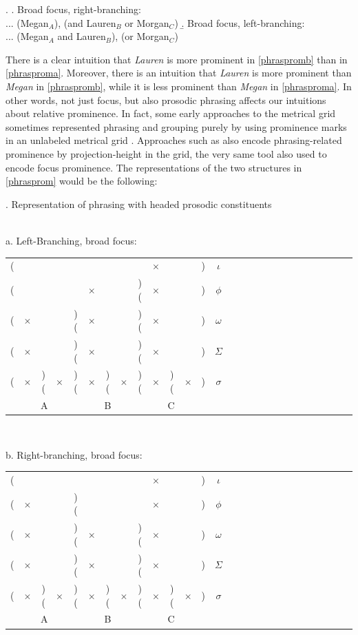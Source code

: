 \documentclass[preprint,review,12pt,authoryear,times]{elsarticle}
\newcommand{\g}{$\times$}
\begin{document}
\ex.\label{phrasprom}
\a. Broad focus, right-branching:\\
... (Megan$_A$), (and Lauren$_B$ or Morgan$_C$) \label{phrasproma}
\b. Broad focus, left-branching:\\
... (Megan$_A$ and Lauren$_B$), (or Morgan$_C$) \label{phraspromb}

There is a clear intuition that {\em Lauren} is more prominent in \ref{phraspromb} than in \ref{phrasproma}.  Moreover, there is an intuition that {\em Lauren} is more prominent than {\em Megan} in  \ref{phraspromb}, while it is less prominent than {\em Megan} in \ref{phrasproma}. In other words, not just focus, but also prosodic phrasing affects our intuitions about relative prominence. In fact, some early approaches to the metrical grid sometimes represented phrasing and grouping purely by using prominence marks in an unlabeled metrical grid \citep[e.g.][]{princ83}. Approaches such as \citet{truck95} also encode phrasing-related prominence by projection-height in the grid, the very same tool also used to encode focus prominence. The representations of the two structures in \ref{phrasprom} would be the following:

\ex. Representation of phrasing with headed prosodic constituents\\\label{phrasingrep}
\vspace{-10pt}
\ \\
\parbox{2in}{\footnotesize a. Left-Branching, broad focus:\\
\vspace{-12pt}
\setlength{\unitlength}{1cm}
\setlength\extrarowheight{-3pt}
\begin{tabular}{ccccccccccccccccccccccccccc}
(&&&&&&&&&\g&&&)&\em $\iota$\\
(&&&&&\g&&&)(&\g&&&)&$\phi$\\
(&\g&&&)(&\g&&&)(&\g&&&)&$\omega$\\
(&\g&&&)(&\g&&&)(&\g&&&)&$\Sigma$\\
(&\g&)(&\g&)(&\g&)(&\g&)(&\g&)(&\g&)&$\sigma$\\
\multicolumn{5}{c}{A}&\multicolumn{3}{c}{B}&\multicolumn{5}{c}{C}\\
\end{tabular}
 }
 \vspace{10pt}
  \ \\
\parbox{2in}{\footnotesize b. Right-branching, broad focus:\\
\vspace{-12pt}
\setlength{\unitlength}{1cm}
\setlength\extrarowheight{-3pt}
\begin{tabular}{ccccccccccccccccccccccccccc}
(&&&&&&&&&\g&&&)&\em $\iota$\\
(&\g&&&)(&&&&&\g&&&)&$\phi$\\
(&\g&&&)(&\g&&&)(&\g&&&)&$\omega$\\
(&\g&&&)(&\g&&&)(&\g&&&)&$\Sigma$\\
(&\g&)(&\g&)(&\g&)(&\g&)(&\g&)(&\g&)&$\sigma$\\
\multicolumn{5}{c}{A}&\multicolumn{3}{c}{B}&\multicolumn{5}{c}{C}\\
\end{tabular}
}\label{ferywide}
\end{document}
